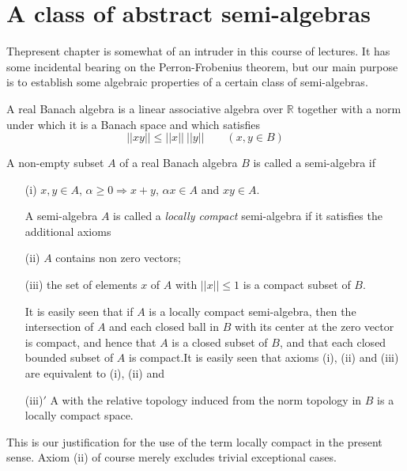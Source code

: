 \chapter{A class of abstract semi-algebras}

The\pageoriginale present chapter is somewhat of an intruder in this
course of lectures. It has some incidental bearing on the
Perron-Frobenius theorem, but our main purpose is to establish some
algebraic properties of a certain class of semi-algebras.  

\begin{Definition}%
  A real Banach algebra is a linear associative algebra over
  $\mathbb{R}$ together with a norm under which it is a Banach space
  and which satisfies  
  $$
  ||xy || \leq || x || ~ || y || \qquad (x, y \in B)
  $$
\end{Definition}

\begin{Definition}%
  A non-empty subset $A$ of a real Banach algebra $B$ is called a
  semi-algebra if  
  \begin{itemize}
  \item[(i)] $x, y \in A$, $\alpha \geq 0 \Rightarrow x + y$, $\alpha x \in
    A$ and $xy \in A$. 
    
    A semi-algebra $A$ is called a \textit{locally compact}
    semi-algebra if it satisfies the additional axioms  

  \item[(ii)] $A$ contains non zero vectors;

  \item[(iii)] the set of elements $x$ of $A$ with $||x || \leq 1$ is a
    compact subset of $B$. 

    It is easily seen that if $A$ is a locally compact semi-algebra,
    then the intersection of $A$ and each closed ball in $B$ with its
    center at the zero vector is compact, and hence that $A$ is a
    closed subset of $B$, and that each closed bounded subset of $A$
    is compact.\pageoriginale It is easily seen that axioms (i), (ii)
    and (iii)  are equivalent to (i), (ii) and  

  \item[(iii)$'$] A with the relative topology induced from the norm
    topology in $B$ is a locally compact space.  
  \end{itemize}
\end{Definition}

This is our justification for the use of the term locally compact in
the present sense. Axiom (ii) of course merely excludes trivial
exceptional cases. 

